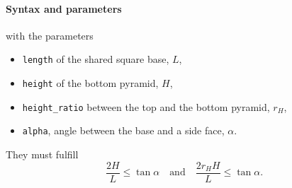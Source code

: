 \begin{figure}[h]
\hfill
{}
\hfill
{}
\hfill
{}
\hfill
\end{figure}

\FloatBarrier

\paragraph{Syntax and parameters}
\begin{quote}
\end{quote}
with the parameters
\begin{itemize}
\item \texttt{length} of the shared square base, $L$,
\item \texttt{height} of the bottom pyramid, $H$,
\item \texttt{height\_ratio} between the top and the bottom pyramid, $r_H$,
\item \texttt{alpha}, angle between the base and a side face, $\alpha$.
\end{itemize}
They must fulfill
\begin{displaymath}
  \dfrac{2H}{L}\le\tan\alpha\quad\text{and}\quad\dfrac{2r_HH}{L}\le\tan\alpha.
\end{displaymath}


